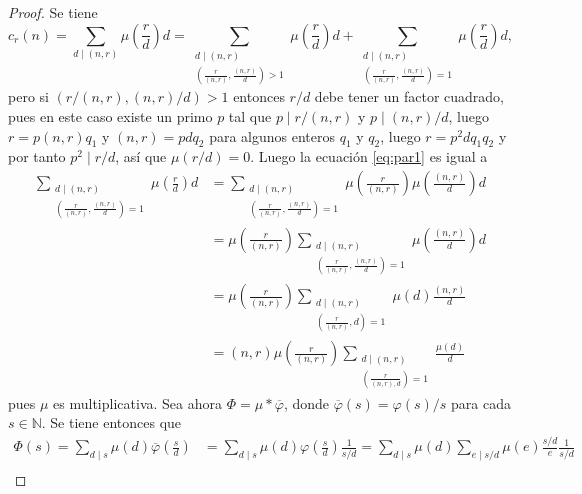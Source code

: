 \begin{proof}
Se tiene
\begin{equation}\label{eq:par1}
    c_r (n) = \sum_{d \mid (n,r)} \mu \left( \frac{r}{d} \right) d = \sum_{\substack{d \mid (n,r) \\ \left( \frac{r}{(n,r)}, \frac{(n,r)}{d} \right) > 1}} \mu \left( \frac{r}{d} \right) d + \sum_{\substack{d \mid (n,r) \\ \left( \frac{r}{(n,r)}, \frac{(n,r)}{d} \right) = 1}} \mu \left( \frac{r}{d} \right) d,
\end{equation}
pero si $(r/(n,r),(n,r)/d)>1$ entonces $r/d$ debe tener un factor cuadrado, pues en este caso existe un primo $p$ tal que $p \mid r/(n,r)$ y $p \mid (n,r)/d$, luego $r=p (n,r) q_1$ y $(n,r)=p d q_2$ para algunos enteros $q_1$ y $q_2$, luego $r=p^2 d q_1 q_2$ y por tanto $p^2 \mid r/d$, así que $\mu(r/d)=0$. Luego la ecuación \eqref{eq:par1} es igual a
\begin{equation}\label{eq:par2}
\begin{split}
    \sum_{\substack{d \mid (n,r) \\ \left( \frac{r}{(n,r)}, \frac{(n,r)}{d} \right) = 1}} \mu \left( \frac{r}{d} \right) d & = \sum_{\substack{d \mid (n,r) \\ \left( \frac{r}{(n,r)}, \frac{(n,r)}{d} \right) = 1}} \mu \left( \frac{r}{(n,r)} \right) \mu \left( \frac{(n,r)}{d} \right) d \\
    & = \mu \left( \frac{r}{(n,r)} \right) \sum_{\substack{d \mid (n,r) \\ \left( \frac{r}{(n,r)}, \frac{(n,r)}{d} \right) = 1}} \mu \left( \frac{(n,r)}{d} \right) d \\
    & = \mu \left( \frac{r}{(n,r)} \right) \sum_{\substack{d \mid (n,r) \\ \left( \frac{r}{(n,r)},d \right)=1}} \mu(d) \frac{(n,r)}{d} \\
    & = (n,r) \mu \left( \frac{r}{(n,r)} \right) \sum_{\substack{d \mid (n,r) \\ \left( \frac{r}{(n,r),d} \right)=1}} \frac{\mu(d)}{d}
\end{split}
\end{equation}
pues $\mu$ es multiplicativa. Sea ahora $\Phi=\mu * \overline{\varphi}$, donde $\overline{\varphi}(s)=\varphi(s)/s$ para cada $s \in \mathbb{N}$. Se tiene entonces que
\begin{equation}\label{eq:par3}
\begin{split}
    \Phi(s) = \sum_{d \mid s} \mu(d) \overline{\varphi} \left( \frac{s}{d} \right) & = \sum_{d \mid s} \mu(d) \varphi \left( \frac{s}{d} \right) \frac{1}{s/d} = \sum_{d \mid s} \mu(d) \sum_{e \mid s/d} \mu(e) \frac{s/d}{e} \frac{1}{s/d} \\

\end{split}
\end{equation}
\end{proof}

